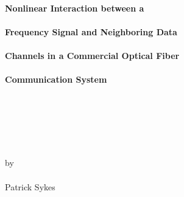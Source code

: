 \thispagestyle{empty}
\hbox{\ }
\vspace{1in}
\renewcommand{\baselinestretch}{1}
\small\normalsize
\begin{center}

\textbf{\Large{{Nonlinear Interaction between a}} \\ 
\ \\
\textbf{\Large{Frequency Signal and Neighboring Data}} \\
\ \\
\textbf{\Large{Channels in a Commercial Optical Fiber}} \\
\ \\
\textbf{\Large{Communication System}}}\\
\ \\
\ \\
\ \\
\ \\
\ \\
\ \\
\large{by} \\
\ \\
\large{Patrick Sykes}%
\ \\
\ \\
\ \\
\ \\
\normalsize
\end{center}

\vspace{7.5em}
